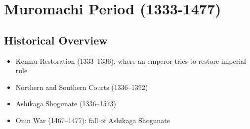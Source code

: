 \documentclass[class=article, crop=false]{standalone}
\begin{document}
  \section{Muromachi Period (1333-1477)}
  \subsection{Historical Overview}
  \begin{itemize}
    \item Kenmu Restoration (1333--1336), where an emperor tries to restore imperial rule
    \item Northern and Southern Courts (1336--1392)
    \item Ashikaga Shogunate (1336--1573)
    \item Onin War (1467--1477): fall of Ashikaga Shogunate
  \end{itemize}
\end{document}
